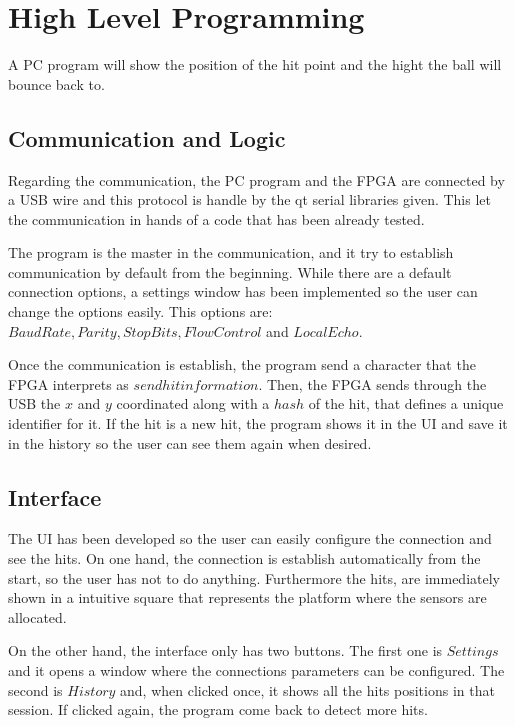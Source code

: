 \chapter{High Level Programming}
\label{chap:high_level_programming}
	A PC program will show the position of the hit point and the hight the ball will bounce back to.

	\section{Communication and Logic}
	\label{sec:communication_and_logic}
		Regarding the communication, the PC program and the FPGA are connected by a USB wire and this protocol is handle by the qt serial libraries given. 
		This let the communication in hands of a code that has been already tested.

		The program is the master in the communication, and it try to establish communication by default from the beginning. 
		While there are a default connection options, a settings window has been implemented so the user can change the options easily. 
		This options are: $Baud Rate, Parity, Stop Bits, Flow Control$ and $Local Echo$.

		Once the communication is establish, the program send a character that the FPGA interprets as $send hit information$. 
		Then, the FPGA sends through the USB the $x$ and $y$ coordinated along with a $hash$ of the hit, that defines a unique identifier for it. 
		If the hit is a new hit, the program shows it in the UI and save it in the history so the user can see them again when desired.

	\section{Interface}
	\label{sec:program_interface}
		The UI has been developed so the user can easily configure the connection and see the hits. 
		On one hand, the connection is establish automatically from the start, so the user has not to do anything. Furthermore the hits, are immediately shown in a intuitive square that represents the platform where the sensors are allocated.

		On the other hand, the interface only has two buttons. The first one is $Settings$ and it opens a window where the connections parameters can be configured. The second is $History$ and, when clicked once, it shows all the hits positions in that session. If clicked again, the program come back to detect more hits.

